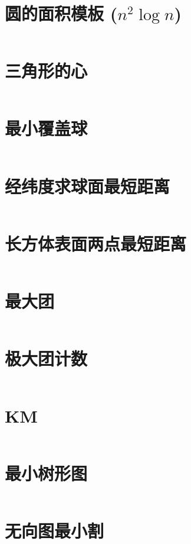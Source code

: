 \documentclass[titlepage,landscape,a4paper,10pt]{article}
\begin{document}
\begin{multicols}{2}
\begin{spacing}{0.8}
\section{圆的面积模板 ($n^2\log n$)}
\inputminted{cpp}{src/圆的面积模板.cpp}

\section{三角形的心}
\inputminted{cpp}{improve/Triangle.cpp}

\section{最小覆盖球}
\inputminted{cpp}{src/最小覆盖球.cpp}

\section{经纬度求球面最短距离}
\inputminted{cpp}{src/经纬度求球面最短距离.cpp}

\section{长方体表面两点最短距离}
\inputminted{cpp}{src/长方体表面两点最短距离.cpp}

\section{最大团}
\inputminted{cpp}{improve/MaximumClique.cpp}

\section{极大团计数}
\inputminted{cpp}{src/极大团计数.cpp}

\section{KM}
\inputminted{cpp}{improve/Hungarian.cpp}

\section{最小树形图}
\inputminted{cpp}{improve/LiuZhu.cpp}

\section{无向图最小割}
\inputminted{cpp}{src/无向图最小割.cpp}


\end{spacing}
\end{multicols}
\end{document}
